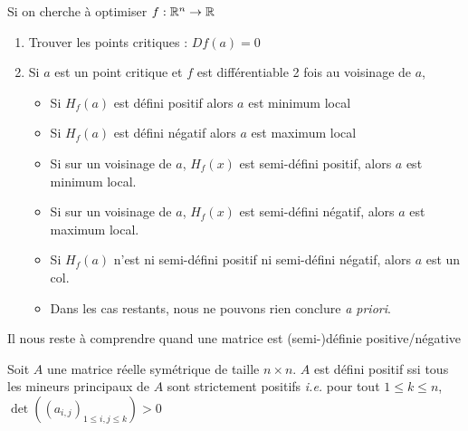 Si on cherche à optimiser $f :\mathbb{R}^n\to\mathbb{R}$
\begin{enumerate}
    \item Trouver les points critiques : $Df(a) = 0$
    \item Si $a$ est un point critique et $f$ est différentiable 2 fois au voisinage de $a$,
    \begin{itemize}
        \item Si $H_f(a)$ est défini positif alors $a$ est minimum local 
        \item Si $H_f(a)$ est défini négatif alors $a$ est maximum local 
        \item Si sur un voisinage de $a$, $H_f(x)$ est semi-défini positif, alors $a$ est minimum local.
        \item Si sur un voisinage de $a$, $H_f(x)$ est semi-défini négatif, alors $a$ est maximum local.
        \item Si $H_f(a)$ n'est ni semi-défini positif ni semi-défini négatif, alors $a$ est un col.
        \item Dans les cas restants, nous ne pouvons rien conclure \textit{a priori}. 
    \end{itemize}
\end{enumerate}
Il nous reste à comprendre quand une matrice est (semi-)définie positive/négative
\begin{proposition}
    Soit $A$ une matrice réelle symétrique de taille $n\times n$.
    $A$ est défini positif ssi tous les mineurs principaux de $A$ sont strictement positifs \textit{i.e.} pour tout $1\le k \le n$,
    $\det({(a_{i,j})}_{1 \le i,j \le k}) > 0$
\end{proposition}
